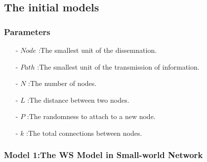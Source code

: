 \subsection{The initial models}
\subsubsection*{Parameters}
\begin{itemize}
	\item[-] $Node$ :The smallest unit of the dissemnation.
	\item[-] $Path$ :The smallest unit of the transmission of information.
	\item[-] $N$ :The number of nodes.
	\item[-] $L$ :The distance between two nodes.
	\item[-] $P$ :The randomness to attach to a new node.
	\item[-] $k$ :The total connections between nodes.
\end{itemize}

\subsubsection*{Model 1:The WS Model in Small-world Network}

